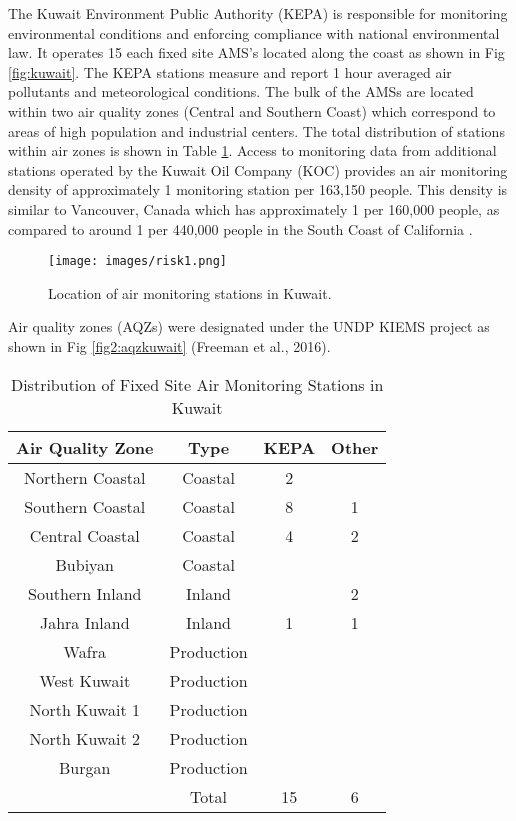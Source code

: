 The Kuwait Environment Public Authority (KEPA) is responsible for monitoring environmental conditions and enforcing compliance with national environmental law. It operates 15 each fixed site AMS’s located along the coast as shown in Fig \ref{fig:kuwait}.  The KEPA stations measure and report 1 hour averaged air pollutants and meteorological conditions. The bulk of the AMSs are located within two air quality zones (Central and Southern Coast) which correspond to areas of high population and industrial centers. The total distribution of stations within air zones is shown in Table \ref{tb:2ams}. Access to monitoring data from additional stations operated by the Kuwait Oil Company (KOC) provides an air monitoring density of approximately 1 monitoring station per 163,150 people. This density is similar to Vancouver, Canada which has approximately 1 per 160,000 people, as compared to around 1 per 440,000 people in the South Coast of California \citep{Marshall2008}.
%  
\begin{figure}
\texttt{[image: images/risk1.png]} 
\caption{Location of air monitoring stations in Kuwait.}
\label{fig1:amskuwait}
\end{figure}
%
Air quality zones (AQZs) were designated under the UNDP KIEMS project as shown in Fig \ref{fig2:aqzkuwait} (Freeman et al., 2016).
%
\begin{table}[!htb]
\centering
\caption{Distribution of Fixed Site Air Monitoring Stations in Kuwait}
\label{tb:2ams}
\begin{tabular}{@{}cccc@{}}
\toprule
\textbf{Air Quality Zone} & \textbf{Type} & \textbf{KEPA} & \textbf{Other} \\ \midrule
Northern Coastal & Coastal & 2 &  \\
Southern Coastal & Coastal & 8 & 1 \\
Central Coastal & Coastal & 4 & 2 \\
Bubiyan & Coastal &  &  \\
Southern Inland & Inland &  & 2 \\
Jahra Inland & Inland & 1 & 1 \\
Wafra & Production &  &  \\
West Kuwait & Production &  &  \\
North Kuwait 1 & Production &  &  \\
North Kuwait 2 & Production &  &  \\
Burgan & Production &  &  \\
 & Total & 15 & 6 \\ \bottomrule
\end{tabular}
\end{table}

